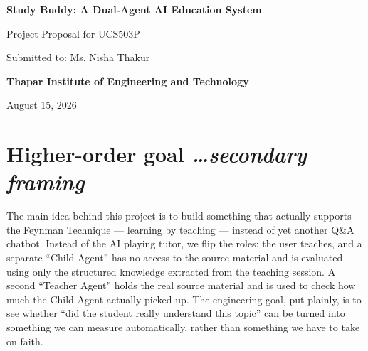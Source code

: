 \documentclass[11pt,a4paper]{article}
\newcommand{\mysection}[2]{%
    \section[#1]{#1 \hfill {\normalfont\itshape #2}}
}
\begin{document}
\thispagestyle{firstpage}

\begin{center}

{\fontsize{18}{21}\selectfont\bfseries
Study Buddy: A Dual-Agent AI Education System
}

\vspace{0.55cm}

{\fontsize{12}{14}\selectfont
Project Proposal for UCS503P
}

\vspace{0.15cm}

{\fontsize{12}{14}\selectfont
Submitted to: Ms. Nisha Thakur
}

\vspace{0.15cm}

{\fontsize{12}{14}\selectfont\bfseries
Thapar Institute of Engineering and Technology
}

\vspace{0.15cm}



\vspace{0.35cm}

{\fontsize{12}{14}\selectfont
August 15, 2026
}

\end{center}

\vspace{0.7cm}


\mysection{Higher-order goal}{\ldots secondary framing}

The main idea behind this project is to build something that actually supports the Feynman Technique --- learning by teaching --- instead of yet another Q\&A chatbot. Instead of the AI playing tutor, we flip the roles: the user teaches, and a separate ``Child Agent'' has no access to the source material and is evaluated using only the structured knowledge extracted from the teaching session. A second ``Teacher Agent'' holds the real source material and is used to check how much the Child Agent actually picked up. The engineering goal, put plainly, is to see whether ``did the student really understand this topic'' can be turned into something we can measure automatically, rather than something we have to take on faith.

\end{document}
